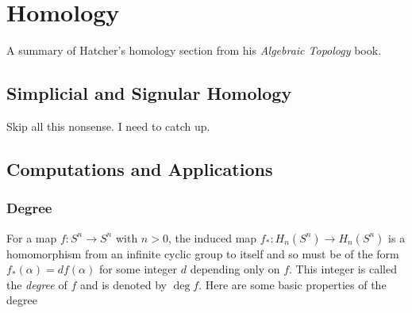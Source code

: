 \chapter{Homology}
A summary of Hatcher's homology section from his \emph{Algebraic Topology}
book.
\section{Simplicial and Signular Homology}
Skip all this nonsense. I need to catch up.
\section{Computations and Applications}
\subsection{Degree}
For a map $f\colon S^n\to S^n$ with $n>0$, the induced map $f_*\colon
H_n(S^n)\to H_n(S^n)$ is a homomorphism from an infinite cyclic group to
itself and so must be of the form $f_*(\alpha)=df(\alpha)$ for some integer
$d$ depending only on $f$. This integer is called the \emph{degree} of $f$
and is denoted by $\deg f$. Here are some basic properties of the degree
